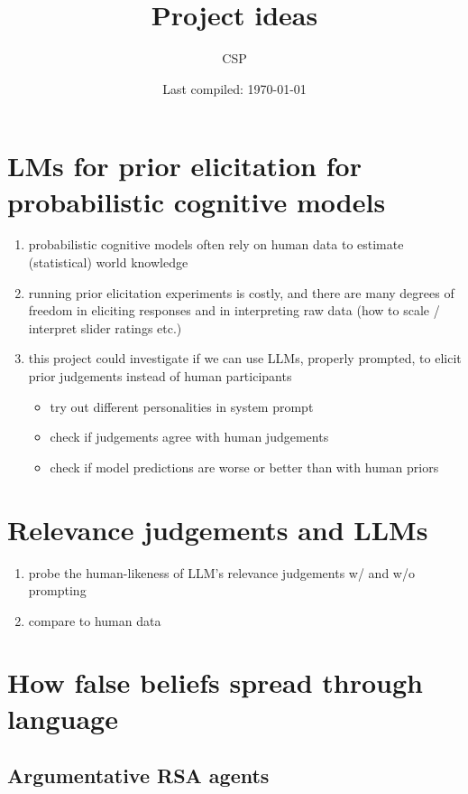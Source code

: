 \documentclass[fleqn,reqno,10pt]{article}
\title{Project ideas}
\author{CSP}
\date{Last compiled: \today}
\begin{document}
\maketitle

\section{LMs for prior elicitation for probabilistic cognitive models}

\begin{enumerate}
  \item probabilistic cognitive models often rely on human data to estimate (statistical) world knowledge
  \item running prior elicitation experiments is costly, and there are many degrees of freedom in eliciting responses and in interpreting raw data (how to scale / interpret slider ratings etc.)
  \item this project could investigate if we can use LLMs, properly prompted, to elicit prior judgements instead of human participants
  \begin{itemize}
    \item try out different personalities in system prompt
    \item check if judgements agree with human judgements
    \item check if model predictions are worse or better than with human priors
  \end{itemize}
\end{enumerate}

\section{Relevance judgements and LLMs}

\begin{enumerate}
  \item probe the human-likeness of LLM's relevance judgements w/ and w/o prompting
  \item compare to human data
\end{enumerate}

\section{How false beliefs spread through language}

\subsection{Argumentative RSA agents}
\end{document}
